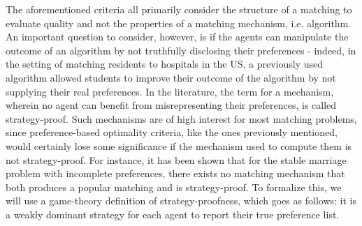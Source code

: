 The aforementioned criteria all primarily consider the structure of a matching to evaluate quality and not the properties of a matching mechanism, i.e. algorithm. An important question to consider, however, is if the agents can manipulate the outcome of an algorithm by not truthfully disclosing their preferences - indeed, in the setting of matching residents to hospitals in the US, a previously used algorithm allowed students to improve their outcome of the algorithm by not supplying their real preferences.\cite{Gusfield} In the literature, the term for a mechanism, wherein no agent can benefit from misrepresenting their preferences, is called strategy-proof. \cite{Klaus} Such mechanisms are of high interest for most matching problems, since preference-based optimality criteria, like the ones previously mentioned, would certainly lose some significance if the mechanism used to compute them is not strategy-proof.
For instance, it has been shown \cite{ROTH1982127} that for the stable marriage problem with incomplete preferences, there exists no matching mechanism that both produces a popular matching and is strategy-proof.
To formalize this, we will use a game-theory definition of strategy-proofness, which goes as follows: it is a weakly dominant strategy for each agent to report their true preference list. \cite{Klaus}

